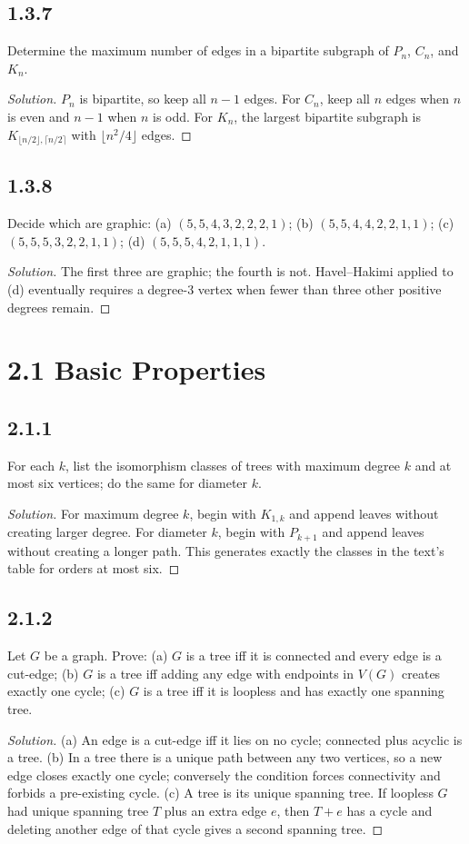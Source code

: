 \documentclass[12pt]{amsart}
\newenvironment{solution}{\begin{proof}[Solution]}{\end{proof}}
\begin{document}
    \subsection*{1.3.7} Determine the maximum number of edges in a bipartite subgraph of $P_n$, $C_n$, and $K_n$.
    \begin{solution}$P_n$ is bipartite, so keep all $n-1$ edges. For $C_n$, keep all $n$ edges when $n$ is even and $n-1$ when $n$ is odd. For $K_n$, the largest bipartite subgraph is $K_{\lfloor n/2\rfloor,\lceil n/2\rceil}$ with $\lfloor n^2/4\rfloor$ edges.\end{solution}
    \subsection*{1.3.8} Decide which are graphic:
    (a) $(5,5,4,3,2,2,2,1)$;
    (b) $(5,5,4,4,2,2,1,1)$;
    (c) $(5,5,5,3,2,2,1,1)$;
    (d) $(5,5,5,4,2,1,1,1)$.
    \begin{solution}The first three are graphic; the fourth is not. Havel--Hakimi applied to (d) eventually requires a degree-3 vertex when fewer than three other positive degrees remain.\end{solution}

    \section*{2.1 Basic Properties}
    \subsection*{2.1.1} For each $k$, list the isomorphism classes of trees with maximum degree $k$ and at most six vertices; do the same for diameter $k$.
    \begin{solution}For maximum degree $k$, begin with $K_{1,k}$ and append leaves without creating larger degree. For diameter $k$, begin with $P_{k+1}$ and append leaves without creating a longer path. This generates exactly the classes in the text's table for orders at most six.\end{solution}
    \subsection*{2.1.2} Let $G$ be a graph. Prove: (a) $G$ is a tree iff it is connected and every edge is a cut-edge; (b) $G$ is a tree iff adding any edge with endpoints in $V(G)$ creates exactly one cycle; (c) $G$ is a tree iff it is loopless and has exactly one spanning tree.
    \begin{solution}(a) An edge is a cut-edge iff it lies on no cycle; connected plus acyclic is a tree. (b) In a tree there is a unique path between any two vertices, so a new edge closes exactly one cycle; conversely the condition forces connectivity and forbids a pre-existing cycle. (c) A tree is its unique spanning tree. If loopless $G$ had unique spanning tree $T$ plus an extra edge $e$, then $T+e$ has a cycle and deleting another edge of that cycle gives a second spanning tree.\end{solution}
\end{document}
